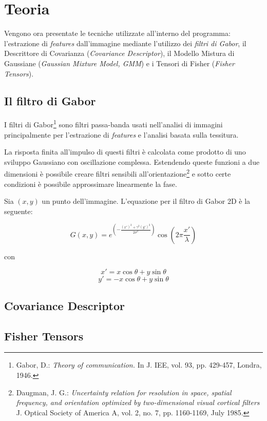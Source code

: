 \section{Teoria}

Vengono ora presentate le tecniche utilizzate all'interno del programma: l'estrazione di \emph{features} dall'immagine mediante l'utilizzo dei \emph{filtri di Gabor}, il Descrittore di Covarianza (\emph{Covariance Descriptor}), il Modello Mistura di Gaussiane (\emph{Gaussian Mixture Model, GMM}) e i Tensori di Fisher (\emph{Fisher Tensors}).

\subsection{Il filtro di Gabor}

I filtri di Gabor\footnote{Gabor, D.: \emph{Theory of communication.} In J. IEE, vol. 93, pp. 429-457, Londra, 1946.} sono filtri passa-banda usati nell'analisi di immagini principalmente per l'estrazione di \emph{features} e l'analisi basata sulla tessitura.

La risposta finita all'impulso di questi filtri è calcolata come prodotto di uno sviluppo Gaussiano con oscillazione complessa. Estendendo queste funzioni a due dimensioni è possibile creare filtri sensibili all'orientazione\footnote{Daugman, J. G.: \emph{Uncertainty relation for resolution in space, spatial frequency, and orientation optimized by two-dimensional visual cortical filters} J. Optical Society of America A, vol. 2, no. 7, pp. 1160-1169, July 1985.} e sotto certe condizioni è possibile approssimare linearmente la fase.

Sia $(x, y)$ un punto dell'immagine. L'equazione per il filtro di Gabor 2D è la seguente:

$$G(x, y) = e^{(- \frac{(x')^2 + \gamma^2 (y')^2}{2 \sigma^2})} \cos (2 \pi \frac{x'}{\lambda})  $$ 

con 

$$x' = x \cos \theta + y \sin \theta$$
$$y' = - x \cos \theta + y \sin \theta$$



\subsection{Covariance Descriptor}

\subsection{Fisher Tensors}